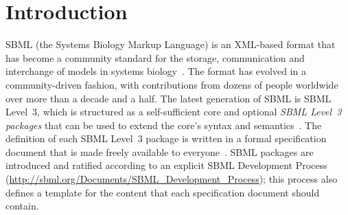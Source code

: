 \documentclass{bmcart}
\begin{document}
\begin{frontmatter}
\begin{abstractbox}

\end{abstractbox}
%

\end{frontmatter}



\section*{Introduction}

SBML (the Systems Biology Markup Language) is an XML-based format that has become a community standard for the storage, communication and interchange of models in systems biology~\cite{hucka2003the, waltemath2014meeting}.  The format has evolved in a community-driven fashion, with contributions from dozens of people worldwide over more than a decade and a half.  The latest generation of SBML is SBML Level~3, which is structured as a self-sufficient core and optional \emph{SBML Level~3 packages} that can be used to extend the core's syntax and semantics~\cite{hucka2015the}.  The definition of each SBML Level~3 package is written in a formal specification document that is made freely available to everyone~\cite{schreiber2015specifications, schreiber2016specifications}.  SBML packages are introduced and ratified according to an explicit SBML Development Process (\url{http://sbml.org/Documents/SBML_Development_Process}); this process also defines a template for the content that each specification document should contain.
\end{document}

